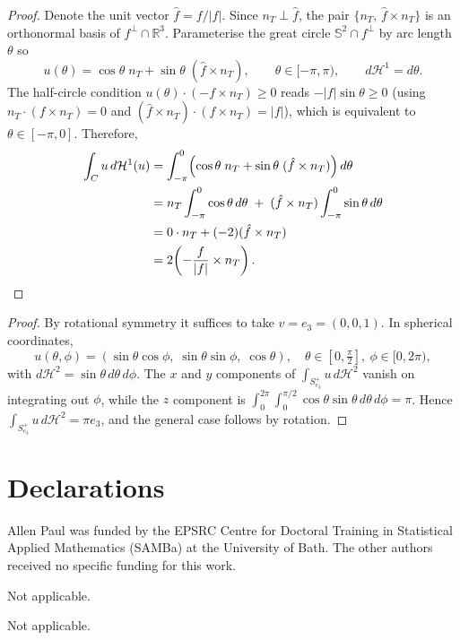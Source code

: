 \documentclass[sn-mathphys-num]{sn-jnl}%
\theoremstyle{thmstyleone}%
\newtheorem{lemma}[theorem]{Lemma}
\theoremstyle{thmstyletwo}%
\theoremstyle{thmstylethree}%
\numberwithin{remark}{section}
\numberwithin{definition}{section}
\numberwithin{equation}{section}
\numberwithin{theorem}{section}
\begin{document}
  \begin{proof} Denote the unit vector $\hat{f} = {f}/{|f|}$.
  Since $n_T \perp \hat{f}$, the pair $\{n_T,\, \hat{f} \times n_T\}$ is an
  orthonormal basis of $f^\perp \cap \mathbb{R}^3$.
  Parameterise the great circle $\mathbb{S}^2 \cap f^\perp$ by arc length $\theta$ so 
  \[
    u(\theta)
    = \cos\theta\; n_T + \sin\theta\;(\hat{f} \times n_T),
    \qquad \theta \in [-\pi, \pi),
    \qquad d\mathcal{H}^1 = d\theta.
  \]
  The half-circle condition $ u(\theta)\cdot( -f \times n_T) \geq 0$
  reads $-|f|\sin\theta \geq 0$ (using $n_T\cdot (f\times n_T)=0$ and $(\hat f\times n_T)\cdot(f\times n_T)=|f|$), which is equivalent to $\theta \in [-\pi, 0]$.
  Therefore,
  \[
    \begin{aligned}
    \int_C u \, d\mathcal{H}^1(u)
    &= \int_{-\pi}^{0}
         \Bigl(\cos\theta\; n_T + \sin\theta\;(\hat{f} \times n_T)\Bigr)
       \, d\theta \\
    &= n_T \int_{-\pi}^{0} \cos\theta \, d\theta
      \;+\;
      (\hat{f} \times n_T) \int_{-\pi}^{0} \sin\theta \, d\theta\\
 &   = 0 \cdot n_T + (-2)(\hat{f} \times n_T)\\
  &  = 2\!\left(-\frac{f}{|f|} \times n_T\right). \qedhere
  \end{aligned}
  \]
  \end{proof}
  
 
  

    
    \begin{proof}
    By rotational symmetry it suffices to take $v = e_3 = (0,0,1)$.
    In spherical coordinates,
    \[
      u(\theta,\phi) = (\sin\theta\cos\phi,\; \sin\theta\sin\phi,\; \cos\theta),
      \quad \theta\in[0,\tfrac{\pi}{2}],\ \phi\in[0,2\pi),
    \]
    with $d\mathcal{H}^2 = \sin\theta\, d\theta\, d\phi$. The $x$ and $y$
    components of $\int_{S^+_{e_3}} u\, d\mathcal{H}^2$ vanish on integrating
    out $\phi$, while the $z$ component is
    $\int_0^{2\pi}\!\int_0^{\pi/2} \cos\theta\sin\theta\, d\theta\, d\phi = \pi$.
    Hence $\int_{S^+_{e_3}} u\, d\mathcal{H}^2 = \pi e_3$, and the general case follows by rotation.
    \end{proof}


\section*{Declarations}

Allen Paul was funded by the EPSRC Centre for Doctoral Training in Statistical Applied Mathematics (SAMBa) at the University of Bath. The other authors received no specific funding for this work.

Not applicable.

Not applicable.


\end{document}
